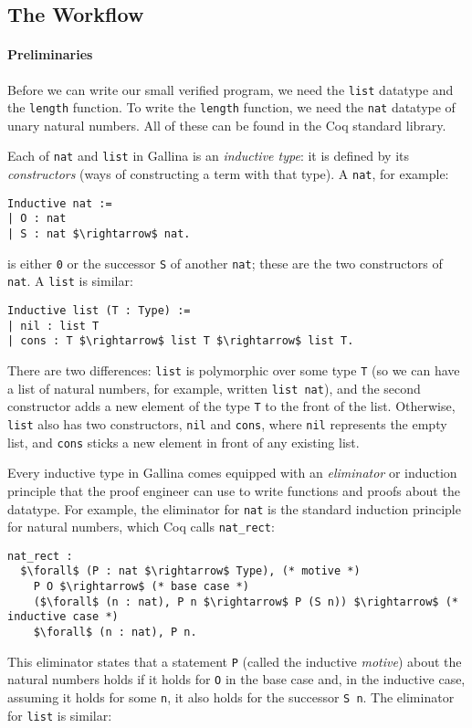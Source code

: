 \subsection{The Workflow}
\label{sec:mot-workflow}

\paragraph{Preliminaries}
Before we can write our small verified program,
we need the \lstinline{list} datatype and the \lstinline{length} function.
To write the \lstinline{length} function, we need the \lstinline{nat} datatype of unary natural numbers.
All of these can be found in the Coq standard library.

Each of \lstinline{nat} and \lstinline{list} in Gallina is an \textit{inductive type}:
it is defined by its \textit{constructors} (ways of constructing a term with that type).
A \lstinline{nat}, for example:

\begin{lstlisting}
Inductive nat :=
| O : nat
| S : nat $\rightarrow$ nat.
\end{lstlisting}
is either \lstinline{0} or the successor \lstinline{S} of another \lstinline{nat};
these are the two constructors of \lstinline{nat}.
A \lstinline{list} is similar:

\begin{lstlisting}
Inductive list (T : Type) :=
| nil : list T
| cons : T $\rightarrow$ list T $\rightarrow$ list T.
\end{lstlisting}
There are two differences: \lstinline{list} is polymorphic over some type \lstinline{T} (so we can have a list of natural numbers,
for example, written \lstinline{list nat}), and the second constructor adds a new element of the type \lstinline{T} to the front of the list.
Otherwise, \lstinline{list} also has two constructors, \lstinline{nil} and \lstinline{cons}, where \lstinline{nil} represents the empty list,
and \lstinline{cons} sticks a new element in front of any existing list.

Every inductive type in Gallina comes equipped with an \textit{eliminator} or induction principle
that the proof engineer can use to write functions and proofs about the datatype.
For example, the eliminator for \lstinline{nat} is the standard induction principle for natural numbers,
which Coq calls \lstinline{nat_rect}: %

\begin{lstlisting}
nat_rect :
  $\forall$ (P : nat $\rightarrow$ Type), (* motive *)
    P O $\rightarrow$ (* base case *)
    ($\forall$ (n : nat), P n $\rightarrow$ P (S n)) $\rightarrow$ (* inductive case *)
    $\forall$ (n : nat), P n.
\end{lstlisting}
This eliminator states that a statement \lstinline{P} (called the inductive \textit{motive}) about the natural numbers
holds if it holds for \lstinline{O} in the base case and, in the inductive case,
assuming it holds for some \lstinline{n}, it also holds for the successor \lstinline{S n}.
The eliminator for \lstinline{list} is similar:


